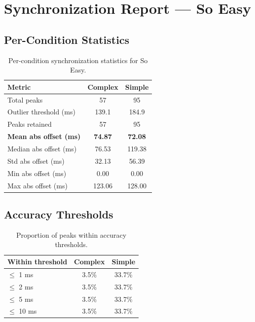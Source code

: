 
\section*{Synchronization Report --- So Easy}

\subsection*{Per-Condition Statistics}

\begin{table}[h!]
\centering
\begin{tabular}{|l|c|c|}
\hline
Metric & Complex & Simple \\
\hline
Total peaks & 57 & 95 \\
Outlier threshold (ms) & 139.1 & 184.9 \\
Peaks retained & 57 & 95 \\
\textbf{Mean abs offset (ms)} & \textbf{74.87} & \textbf{72.08} \\
Median abs offset (ms) & 76.53 & 119.38 \\
Std abs offset (ms) & 32.13 & 56.39 \\
Min abs offset (ms) & 0.00 & 0.00 \\
Max abs offset (ms) & 123.06 & 128.00 \\
\hline
\end{tabular}
\caption{Per-condition synchronization statistics for So Easy.}
\label{tab:sync_stats}
\end{table}

\subsection*{Accuracy Thresholds}

\begin{table}[h!]
\centering
\begin{tabular}{|l|c|c|}
\hline
Within threshold & Complex & Simple \\
\hline
$\leq$ 1 ms & 3.5\% & 33.7\% \\
$\leq$ 2 ms & 3.5\% & 33.7\% \\
$\leq$ 5 ms & 3.5\% & 33.7\% \\
$\leq$ 10 ms & 3.5\% & 33.7\% \\
\hline
\end{tabular}
\caption{Proportion of peaks within accuracy thresholds.}
\label{tab:sync_accuracy}
\end{table}

